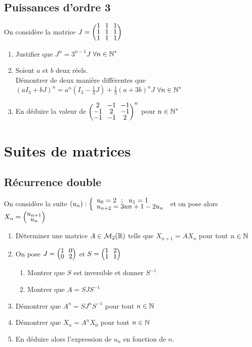 \documentclass[oneside,12pt]{book}          %
\begin{document}
\subsection{Puissances d'ordre 3}
On considère la matrice $J=\matrice{1&1&1\\1&1&1\\1&1&1}$
\begin{enumerate}
    \item Justifier que $J^n=3^{n-1}J$ \quad $\forall {n\in\mathbb N}^*$
    \item Soient $a$ et $b$ deux réels.\\
    Démontrer de deux manière différentes que $(aI_3+bJ)^n=a^n(I_3-\frac{1}{3}J)+\frac{1}{3}(a+3b)^nJ$ \quad $\forall {n\in\mathbb N}^*$
    \item En déduire la valeur de $\matrice{2&-1&-1\\-1&2&-1\\-1&-1&2}^n$ pour ${n\in\mathbb N}^*$
\end{enumerate}



\section{Suites de matrices}

\subsection{Récurrence double}
On considère la suite $(u_n):\accolsized{u_0=2~~;~~u_1=1\\u_{n+2}=3u{n+1}-2u_n}{0.7}$ et on pose alors $X_n=\matrice{u_{n+1}\\u_n}$

\begin{enumerate}
 	\item Déterminer une matrice $A\in\mathcal{M}_2({\mathbb R})$ telle que $X_{n+1}=AX_n$ pour tout ${n\in\mathbb N}$
 	\item On pose $J=\matrice{1&0\\0&2}$ et $S=\matrice{1&2\\1&1}$
 	\begin{enumerate}
 		\item Montrer que $S$ est inversible et donner $S^{-1}$
 		\item Montrer que $A=SJS^{-1}$
 	\end{enumerate}
 	\item Démontrer que $A^n=SJ^nS^{-1}$ pour tout ${n\in\mathbb N}$
 	\item Démontrer que $X_n=A^nX_0$ pour tout ${n\in\mathbb N}$
 	\item En déduire alors l'expression de $u_n$ en fonction de $n$.
\end{enumerate}
\end{document}
